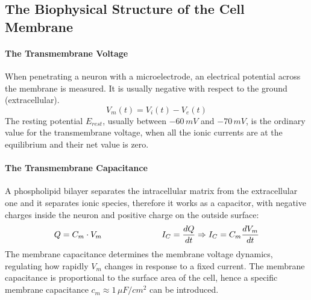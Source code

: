 \subsection{The Biophysical Structure of the Cell Membrane}
\paragraph{The Transmembrane Voltage}
When penetrating a neuron with a microelectrode, an electrical potential across the membrane is
measured. It is usually negative with respect to the ground (extracellular).
\begin{equation*}
    V_{m}(t)=V_{i}(t)-V_{e}(t)
\end{equation*}
The resting potential \(E_{rest}\), usually between \(-60\,mV\) and \(-70\,mV\), is the ordinary value for the
transmembrane voltage, when all the ionic currents are at the equilibrium and their net value is
zero.
\paragraph{The Transmembrane Capacitance}
A phospholipid bilayer separates the intracellular matrix from the extracellular one and it
separates ionic species, therefore it works as a capacitor, with negative charges inside the neuron
and positive charge on the outside surface:
\begin{equation*}
    Q=C_{m}\cdot V_{m}
    \hspace*{2.5cm}
    I_{C}=\frac{dQ}{dt}\Rightarrow
    I_{C}=C_{m}\frac{dV_{m}}{dt}
\end{equation*}
The membrane capacitance determines the membrane voltage dynamics, regulating how rapidly \(V_{m}\)
changes in response to a fixed current. The membrane capacitance is proportional to the surface area
of the cell, hence a specific membrane capacitance \(c_{m}\approx{1\,\mu{F}/cm^{2}}\) can be
introduced.
